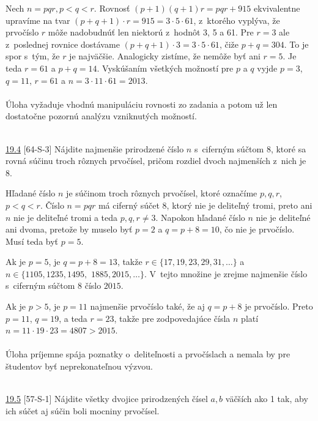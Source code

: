 \rieh Nech $n = pqr, p < q < r$. Rovnosť $(p + 1)(q + 1)r = pqr + 915$ ekvivalentne upravíme na tvar $(p + q + 1) \cdot r = 915 = 3 \cdot 5 \cdot 61$, z~ktorého vyplýva, že prvočíslo $r$ môže nadobudnúť len niektorú z~hodnôt 3, 5 a 61. Pre $r = 3$ ale z~poslednej rovnice dostávame $(p + q + 1) \cdot 3 = 3 \cdot 5 \cdot 61$, čiže $p + q = 304$. To je spor s~tým, že $r$ je najväčšie. Analogicky zistíme, že nemôže byť ani $r = 5$. Je teda $r = 61$ a $p + q = 14$. Vyskúšaním všetkých možností pre $p$ a $q$ vyjde $p = 3$, $q = 11$, $r = 61$ a $n = 3 \cdot 11 \cdot 61 = 2 013$.\\
\\
\kom Úloha vyžaduje vhodnú manipuláciu rovnosti zo zadania a potom už len dostatočne pozornú analýzu vzniknutých možností.\\
\\
\begin{tcolorbox}[breakable,notitle,boxrule=0pt,colback=light-gray,colframe=light-gray]\ul{19.4} [64-S-3]
Nájdite najmenšie prirodzené číslo $n$ s~ciferným súčtom 8, ktoré sa rovná súčinu troch rôznych prvočísel, pričom rozdiel dvoch najmenších z~nich je 8.

\end{tcolorbox}

\rieh Hľadané číslo $n$ je súčinom troch rôznych prvočísel, ktoré označíme $p, q, r$, $p < q < r$. Číslo $n = pqr$ má ciferný súčet 8, ktorý nie je deliteľný tromi, preto ani $n$ nie je deliteľné tromi a teda $p, q, r \neq 3$. Napokon hľadané číslo $n$ nie je deliteľné ani dvoma, pretože by muselo byť $p = 2$ a $q = p + 8 = 10$, čo nie je prvočíslo. Musí teda byť $p = 5$.

Ak je $p = 5$, je $q = p + 8 = 13$, takže $r \in \{17, 19, 23, 29, 31, \ldots \}$ a $n \in \{1 105,1 235, 1 495,$ $1 885, 2 015, \ldots\}$. V~tejto množine je zrejme najmenšie číslo s~ciferným súčtom 8 číslo $2 015$.

Ak je $p > 5$, je $p = 11$ najmenšie prvočíslo také, že aj $q = p + 8$ je prvočíslo. Preto $p = 11$, $q = 19$, a teda $r = 23$, takže pre zodpovedajúce čísla $n$ platí $n = 11 \cdot 19 \cdot 23= 4 807 > 2 015$.\\
\\
\kom Úloha príjemne spája poznatky o~deliteľnosti a prvočíslach a nemala by pre študentov byť neprekonateľnou výzvou.\\
\\
\begin{tcolorbox}[breakable,notitle,boxrule=0pt,colback=light-gray,colframe=light-gray]\ul{19.5} [57-S-1]
Nájdite všetky dvojice prirodzených čísel $a, b$ väčších ako 1 tak, aby ich súčet aj súčin boli mocniny prvočísel.

\end{tcolorbox}

